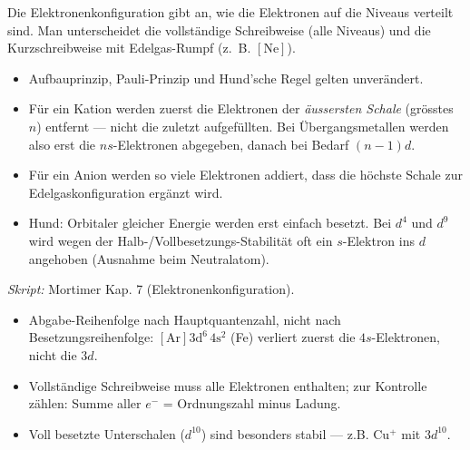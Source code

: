 
Die Elektronenkonfiguration gibt an, wie die Elektronen auf die Niveaus
verteilt sind. Man unterscheidet die vollständige Schreibweise (alle Niveaus)
und die Kurzschreibweise mit Edelgas-Rumpf (z.\ B. ${}[\mathrm{Ne}]$).

\begin{werkzeugkasten}
\begin{itemize}
  \item Aufbauprinzip, Pauli-Prinzip und Hund'sche Regel gelten unverändert.
  \item Für ein Kation werden zuerst die Elektronen der \textit{äussersten
        Schale} (grösstes $n$) entfernt --- nicht die zuletzt aufgefüllten.
        Bei Übergangsmetallen werden also erst die $ns$-Elektronen abgegeben,
        danach bei Bedarf $(n-1)d$.
  \item Für ein Anion werden so viele Elektronen addiert, dass die höchste
        Schale zur Edelgaskonfiguration ergänzt wird.
  \item Hund: Orbitaler gleicher Energie werden erst einfach besetzt. Bei
        $d^4$ und $d^9$ wird wegen der Halb-/Vollbesetzungs-Stabilität oft ein
        $s$-Elektron ins $d$ angehoben (Ausnahme beim Neutralatom).
\end{itemize}
\textit{Skript:} Mortimer Kap. 7 (Elektronenkonfiguration).
\end{werkzeugkasten}

\begin{achtung}
\begin{itemize}
  \item Abgabe-Reihenfolge nach Hauptquantenzahl, nicht nach
        Besetzungsreihenfolge: $\mathrm{[Ar]3d^6\,4s^2}$ (Fe) verliert zuerst die
        $4s$-Elektronen, nicht die $3d$.
  \item Vollständige Schreibweise muss alle Elektronen enthalten; zur Kontrolle
        zählen: Summe aller $e^-$ = Ordnungszahl minus Ladung.
  \item Voll besetzte Unterschalen ($d^{10}$) sind besonders stabil --- z.B.
        $\mathrm{Cu^+}$ mit $3d^{10}$.
\end{itemize}
\end{achtung}
